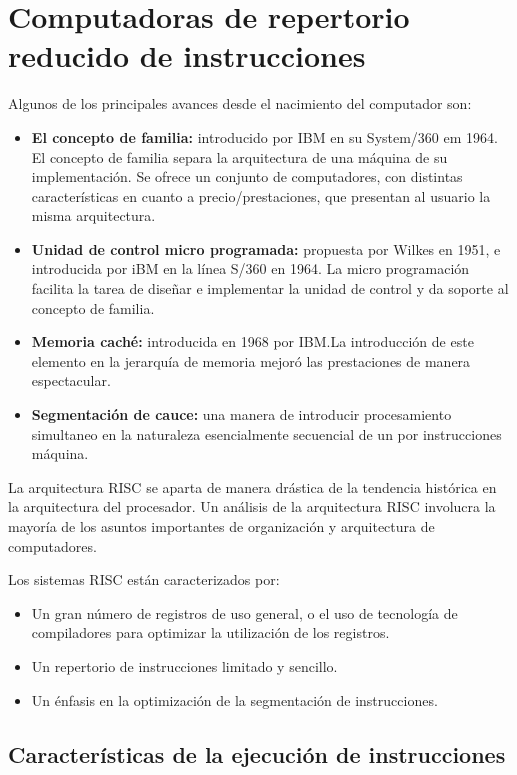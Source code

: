 \section{Computadoras de repertorio reducido de instrucciones}\label{sec:risc}

Algunos de los principales avances desde el nacimiento del computador son:

\begin{itemize}
  \item \textbf{El concepto de familia:} introducido por IBM en su System/360 em 1964. El concepto de familia separa la arquitectura de una máquina de su implementación. Se ofrece un conjunto de computadores, con distintas características en cuanto a precio/prestaciones, que presentan al usuario la misma arquitectura.
  \item \textbf{Unidad de control micro programada:} propuesta por Wilkes en 1951, e introducida por iBM en la línea S/360 en 1964. La micro programación facilita la tarea de diseñar e implementar la unidad de control y da soporte al concepto de familia.
  \item \textbf{Memoria caché:} introducida en 1968 por IBM.\@ La introducción de este elemento en la jerarquía de memoria mejoró las prestaciones de manera espectacular.
  \item \textbf{Segmentación de cauce:} una manera de introducir procesamiento simultaneo en la naturaleza esencialmente secuencial de un por instrucciones máquina.
\end{itemize}

La arquitectura RISC se aparta de manera drástica de la tendencia histórica en la arquitectura del procesador. Un análisis de la arquitectura RISC involucra la mayoría de los asuntos importantes de organización y arquitectura de computadores.

Los sistemas RISC están caracterizados por:

\begin{itemize}
  \item Un gran número de registros de uso general, o el uso de tecnología de compiladores para optimizar la utilización de los registros.
  \item Un repertorio de instrucciones limitado y sencillo.
  \item Un énfasis en la optimización de la segmentación de instrucciones.
\end{itemize}

\subsection{Características de la ejecución de instrucciones}

